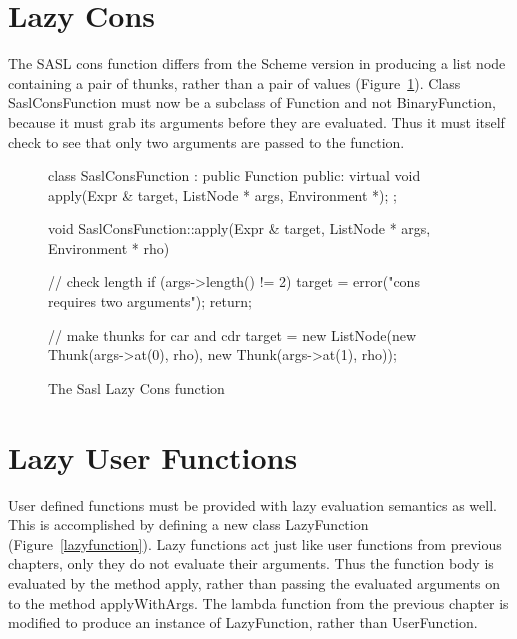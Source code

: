 \section{Lazy Cons}

The SASL cons function differs from the Scheme version in producing
a list node containing a pair of thunks, rather than a pair of values
(Figure~\ref{saslcons}).  Class {\sf SaslConsFunction} must now be a
subclass of {\sf Function} and not {\sf BinaryFunction}, because it must
grab its arguments before they are evaluated.  Thus it must itself check to
see that only two arguments are passed to the function.

\begin{figure}
\begin{cprog}
class SaslConsFunction : public Function {
public:
	virtual void apply(Expr & target, ListNode * args, Environment *);
};

void SaslConsFunction::apply(Expr & target, ListNode * args, Environment * rho)
{
	// check length
	if (args->length() != 2) {
		target = error("cons requires two arguments");
		return;
		}

	// make thunks for car and cdr
	target = new ListNode(new Thunk(args->at(0), rho), 
		new Thunk(args->at(1), rho));
}
\end{cprog}
\caption{The Sasl Lazy Cons function}\label{saslcons}
\end{figure}

\section{Lazy User Functions}

User defined functions must be provided with lazy evaluation semantics as
well.  This is accomplished by defining a new class {\sf LazyFunction}
(Figure~\ref{lazyfunction}).  Lazy functions act just like user functions
from previous chapters, only they do not evaluate their arguments.   Thus
the function body is evaluated by the method {\sf apply}, rather than
passing the evaluated arguments on to the method {\sf applyWithArgs}.
The lambda function from the previous chapter is modified to produce
an instance of {\sf LazyFunction}, rather than {\sf UserFunction}.

